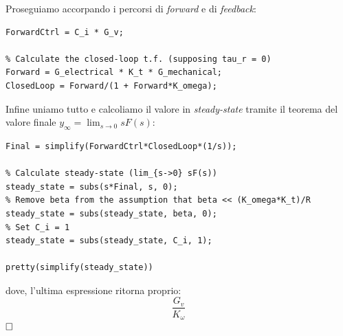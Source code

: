  Proseguiamo accorpando i percorsi di \textit{forward} e di \textit{feedback}:

\begin{lstlisting}[frame=single,style=Matlab-editor]	
% Simplify controller (remember that here K_i = 0)
ForwardCtrl = C_i * G_v;
	
% Calculate the closed-loop t.f. (supposing tau_r = 0)
Forward = G_electrical * K_t * G_mechanical;
ClosedLoop = Forward/(1 + Forward*K_omega);
\end{lstlisting}



 Infine uniamo tutto e calcoliamo il valore in \textit{steady-state} tramite il teorema del valore finale $y_\infty = \lim_{s\to0}sF(s)$:
\begin{lstlisting}[frame=single,style=Matlab-editor]
% Put everything toghether
Final = simplify(ForwardCtrl*ClosedLoop*(1/s));

% Calculate steady-state (lim_{s->0} sF(s))
steady_state = subs(s*Final, s, 0);
% Remove beta from the assumption that beta << (K_omega*K_t)/R
steady_state = subs(steady_state, beta, 0);
% Set C_i = 1
steady_state = subs(steady_state, C_i, 1);

pretty(simplify(steady_state))
\end{lstlisting}

dove, l'ultima espressione ritorna proprio:
$$
\frac{G_v}{K_\omega}
$$
$\hfill \square$